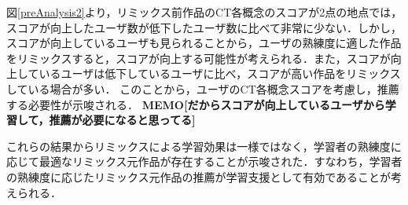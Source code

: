 \documentclass[submit,techrep,noauthor]{ipsj}
\newcommand{\memo}[1]{\colorbox{magenta!30}{\textbf{MEMO}}{\color{red!50}\textbf{[#1]}}}
\begin{document}
図\ref{preAnalysis2}より，リミックス前作品のCT各概念のスコアが2点の地点では，スコアが向上したユーザ数が低下したユーザ数に比べて非常に少ない．しかし，スコアが向上しているユーザも見られることから，ユーザの熟練度に適した作品をリミックスすると，スコアが向上する可能性が考えられる．また，スコアが向上しているユーザは低下しているユーザに比べ，スコアが高い作品をリミックスしている場合が多い．
このことから，ユーザのCT各概念スコアを考慮し，推薦する必要性が示唆される．
\memo{だからスコアが向上しているユーザから学習して，推薦が必要になると思ってる}

これらの結果からリミックスによる学習効果は一様ではなく，学習者の熟練度に応じて最適なリミックス元作品が存在することが示唆された．すなわち，学習者の熟練度に応じたリミックス元作品の推薦が学習支援として有効であることが考えられる．
\end{document}
